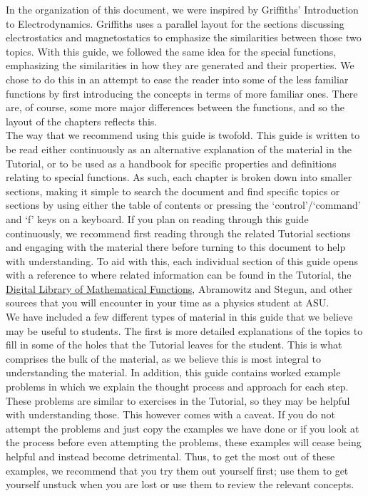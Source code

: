 \documentclass[11pt]{report}
\begin{document}
In the organization of this document, we were inspired by Griffiths’ Introduction to Electrodynamics. Griffiths uses a parallel layout for the sections discussing electrostatics and magnetostatics to emphasize the similarities between those two topics. With this guide, we followed the same idea for the special functions, emphasizing the similarities in how they are generated and their properties. We chose to do this in an attempt to ease the reader into some of the less familiar functions by first introducing the concepts in terms of more familiar ones. There are, of course, some more major differences between the functions, and so the layout of the chapters reflects this.\\

The way that we recommend using this guide is twofold. This guide is written to be read either continuously as an alternative explanation of the material in the Tutorial, or to be used as a handbook for specific properties and definitions relating to special functions. As such, each chapter is broken down into smaller sections, making it simple to search the document and find specific topics or sections by using either the table of contents or pressing the `control'/`command' and `f' keys on a keyboard. If you plan on reading through this guide continuously, we recommend first reading through the related Tutorial sections and engaging with the material there before turning to this document to help with understanding. To aid with this, each individual section of this guide opens with a reference to where related information can be found in the Tutorial, the \href{https://dlmf.nist.gov/}{Digital Library of Mathematical Functions}, Abramowitz and Stegun, and other sources that you will encounter in your time as a physics student at ASU.\\

We have included a few different types of material in this guide that we believe may be useful to students. The first is more detailed explanations of the topics to fill in some of the holes that the Tutorial leaves for the student. This is what comprises the bulk of the material, as we believe this is most integral to understanding the material. In addition, this guide contains worked example problems in which we explain the thought process and approach for each step. These problems are similar to exercises in the Tutorial, so they may be helpful with understanding those. This however comes with a caveat. If you do not attempt the problems and just copy the examples we have done or if you look at the process before even attempting the problems, these examples will cease being helpful and instead become detrimental. Thus, to get the most out of these examples, we recommend that you try them out yourself first; use them to get yourself unstuck when you are lost or use them to review the relevant concepts.\\
\end{document}
